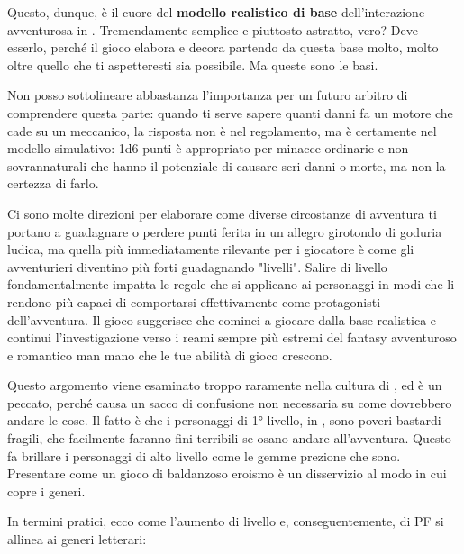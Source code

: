 Questo, dunque, è il cuore del \textbf{modello realistico di base} dell'interazione avventurosa in \dnd{}. Tremendamente semplice e piuttosto astratto, vero? Deve esserlo, perché il gioco elabora e decora partendo da questa base molto, molto oltre quello che ti aspetteresti sia possibile. Ma queste sono le basi.

Non posso sottolineare abbastanza l'importanza per un futuro arbitro di comprendere questa parte: quando ti serve sapere quanti danni fa un motore che cade su un meccanico, la risposta non è nel regolamento, ma è certamente nel modello simulativo: 1d6 punti è appropriato per minacce ordinarie e non sovrannaturali che hanno il potenziale di causare seri danni o morte, ma non la certezza di farlo.




Ci sono molte direzioni per elaborare come diverse circostanze di avventura ti portano a guadagnare o perdere punti ferita in un allegro girotondo di goduria ludica, ma quella più immediatamente rilevante per i giocatore è come gli avventurieri diventino più forti guadagnando "livelli". Salire di livello fondamentalmente impatta le regole che si applicano ai personaggi in modi che li rendono più capaci di comportarsi effettivamente come protagonisti dell'avventura. Il gioco suggerisce che cominci a giocare dalla base realistica e continui l'investigazione verso i reami sempre più estremi del fantasy avventuroso e romantico man mano che le tue abilità di gioco crescono.

Questo argomento viene esaminato troppo raramente nella cultura di \dnd{}, ed è un peccato, perché causa un sacco di confusione non necessaria su come dovrebbero andare le cose. Il fatto è che i personaggi di 1° livello, in \dnd{}, sono poveri bastardi fragili, che facilmente faranno fini terribili se osano andare all'avventura. Questo fa brillare i personaggi di alto livello come le gemme prezione che sono. Presentare \dnd{} come un gioco di baldanzoso eroismo è un disservizio al modo in cui copre i generi.

In termini pratici, ecco come l'aumento di livello e, conseguentemente, di PF si allinea ai generi letterari:

